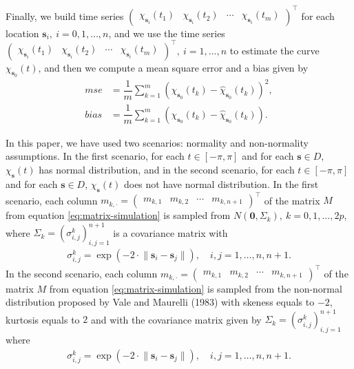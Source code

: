 \documentclass[12pt,]{article}
\theoremstyle{definition}
\theoremstyle{definition}
\theoremstyle{definition}
\theoremstyle{remark}
\begin{document}
Finally, we build time series \(\begin{pmatrix} \chi_{\bm{s}_i}(t_1) & \chi_{\bm{s}_i}(t_2) & \cdots & \chi_{\bm{s}_i}(t_m) \end{pmatrix}^\top\) for each location \(\bm{s}_i,\ i =0,1,\dots, n\), and we use the time series \(\begin{pmatrix} \chi_{\bm{s}_i}(t_1) & \chi_{\bm{s}_i}(t_2) & \cdots & \chi_{\bm{s}_i}(t_m) \end{pmatrix}^\top,\ i =1, \dots, n\) to estimate the curve \(\chi_{\bm{s}_0}(t)\), and then we compute a mean square error and a bias given by
\begin{align*}
 mse &=   \dfrac{1}{m} \sum_{k=1}^{m} (\chi_{\bm{s}_0}(t_k) - \hat{\chi}_{\bm{s}_0}(t_k))^2,\\
 bias &=   \dfrac{1}{m} \sum_{k=1}^{m} (\chi_{\bm{s}_0}(t_k) - \hat{\chi}_{\bm{s}_0}(t_k)).
\end{align*}

In this paper, we have used two scenarios: normality and non-normality assumptions. In the first scenario, for each \(t \in [-\pi, \pi]\) and for each \(\bm{s} \in D\), \(\chi_{\bm{s}}(t)\) has normal distribution, and in the second scenario, for each \(t \in [-\pi, \pi]\) and for each \(\bm{s} \in D\), \(\chi_{\bm{s}}(t)\) does not have normal distribution. In the first scenario, each column \(m_{k,\cdot} = \begin{pmatrix} m_{k,1} & m_{k,2} & \cdots & m_{k,n+1} \end{pmatrix}^\top\) of the matrix \(M\) from equation \eqref{eq:matrix-simulation} is sampled from \(N(\bm{0}, \Sigma_k),\ k=0,1,\dots, 2p\), where \(\Sigma_k = (\sigma_{i,j}^k)_{i,j=1}^{n+1}\) is a covariance matrix with
\begin{align*}
 \sigma_{i,j}^k = \exp \left( -2 \cdot \lVert \bm{s}_i - \bm{s}_j \rVert \right), \quad i,j=1, \dots, n, n+1.
\end{align*}
In the second scenario, each column \(m_{k,\cdot} = \begin{pmatrix} m_{k,1} & m_{k,2} & \cdots & m_{k,n+1} \end{pmatrix}^\top\) of the matrix \(M\) from equation \eqref{eq:matrix-simulation} is sampled from the non-normal distribution proposed by Vale and Maurelli (1983) with skeness equals to \(-2\), kurtosis equals to \(2\) and with the covariance matrix given by \(\Sigma_k = (\sigma_{i,j}^k)_{i,j=1}^{n+1}\) where
\begin{align*}
 \sigma_{i,j}^k = \exp \left( -2 \cdot \lVert \bm{s}_i - \bm{s}_j \rVert \right), \quad i,j=1, \dots, n, n+1.
\end{align*}
\end{document}
